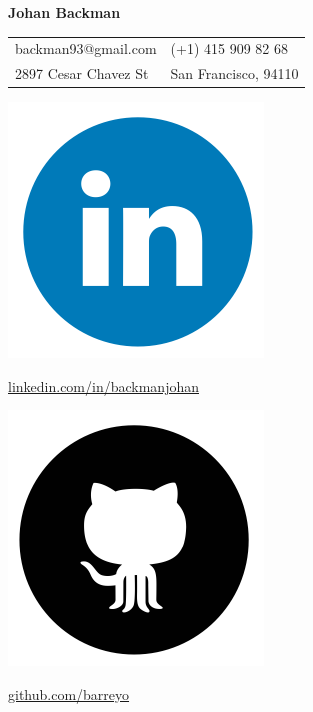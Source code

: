 \documentclass{cv_doc}
\begin{document}
\textbf{{\sffamily\huge Johan Backman}} \\

\begin{tabular}{@{}l l }
 backman93@gmail.com & (+1) 415 909 82 68 \\
 2897 Cesar Chavez St & San Francisco, 94110 \\
\end{tabular}

\vspace{0.12cm}

\begin{minipage}[c]{0.03\textwidth}
\includegraphics[scale=0.04]{linkedin}
\end{minipage}
\begin{minipage}[c]{0.25\textwidth}
{\small \href{https://linkedin.com/in/backmanjohan}{linkedin.com/in/backmanjohan}}
\end{minipage}

\begin{minipage}[c]{0.03\textwidth}
\includegraphics[scale=0.04]{github}
\end{minipage}
\begin{minipage}[c]{0.25\textwidth}
{\small \href{https://github.com/barreyo}{github.com/barreyo}}
\end{minipage}
\end{document}
